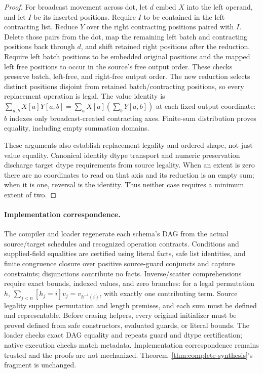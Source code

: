 \begin{proof}
For broadcast movement across dot, let $d$ embed $X$ into the left operand,
and let $I$ be its inserted positions. Require $I$ to be contained in the
left contracting list. Reduce $Y$ over the right contracting positions paired
with $I$. Delete those pairs from the dot, map the remaining left batch and
contracting positions back through $d$, and shift retained right positions
after the reduction. Require left batch positions to be embedded original
positions and the mapped left free positions to occur in the source's free
output order. These checks preserve batch, left-free, and right-free output
order. The new reduction selects distinct positions disjoint from retained
batch/contracting positions, so every replacement operation is legal. The
value identity is
$\sum_{a,b}X[a]Y[a,b]=\sum_a X[a](\sum_bY[a,b])$ at each fixed output
coordinate: $b$ indexes only broadcast-created contracting axes. Finite-sum
distribution proves equality, including empty summation domains.

These arguments also establish replacement legality and ordered shape,
not just value equality. Canonical identity dtype transport and numeric
preservation discharge target dtype requirements from source legality.
When an extent is zero there are no coordinates to read on that axis and
its reduction is an empty sum; when it is one, reversal is the identity.
Thus neither case requires a minimum extent of two.
\end{proof}

\paragraph{Implementation correspondence.}
The compiler and loader regenerate each schema's DAG from the actual
source/target schedules and recognized operation contracts. Conditions and
supplied-field equalities are certified using literal facts, safe list
identities, and finite congruence closure over positive source-guard
conjuncts and capture constraints; disjunctions contribute no facts.
Inverse/scatter comprehensions require exact bounds, indexed values, and
zero branches: for a legal permutation $h$,
$\sum_{j<n}[h_j=i]v_j=v_{h^{-1}(i)}$, with exactly one contributing term.
Source legality supplies permutation and length premises, and each sum must
be defined and representable. Before erasing helpers, every original
initializer must be proved defined from safe constructors, evaluated guards,
or literal bounds. The loader checks exact DAG equality and repeats guard
and dtype certification; native execution checks match metadata.
Implementation correspondence remains trusted and the proofs are not
mechanized. Theorem~\ref{thm:complete-synthesis}'s fragment is unchanged.
